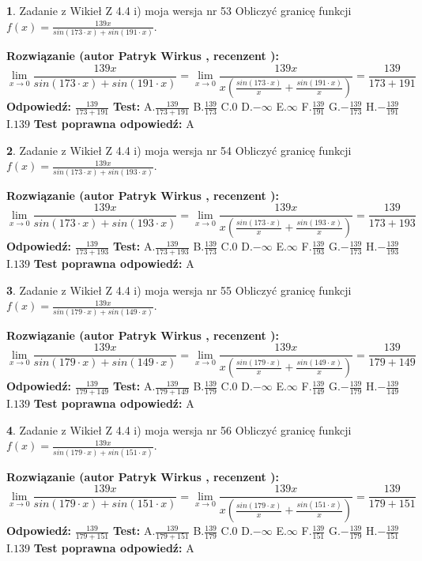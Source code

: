 \documentclass[12pt, a4paper]{article}
\theoremstyle{definition} %
\newtheorem{zad}{}
\newcommand{\zadStart}[1]{\begin{zad}#1\newline}
\newcommand{\zadStop}{\end{zad}}
\newcommand{\rozwStart}[2]{\noindent \textbf{Rozwiązanie (autor #1 , recenzent #2): }\newline}
\newcommand{\rozwStop}{\newline}
\newcommand{\odpStart}{\noindent \textbf{Odpowiedź:}\newline}
\newcommand{\odpStop}{\newline}
\newcommand{\testStart}{\noindent \textbf{Test:}\newline}
\newcommand{\testStop}{\newline}
\newcommand{\kluczStart}{\noindent \textbf{Test poprawna odpowiedź:}\newline}
\newcommand{\kluczStop}{\newline}
\begin{document}
\zadStart{Zadanie z Wikieł Z 4.4 i) moja wersja nr 53}
Obliczyć granicę funkcji $f(x)=\frac{139x}{sin(173\cdot x) +sin(191\cdot x)}$.
\zadStop
\rozwStart{Patryk Wirkus}{}
$$\lim\limits_{x\to 0}\frac{139x}{sin(173\cdot x) +sin(191\cdot x)}=\lim\limits_{x\to 0}\frac{139x}{x(\frac{sin(173\cdot x)}{x}+\frac{sin(191\cdot x)}{x})}=\frac{139}{173+191}$$
\rozwStop
\odpStart
$\frac{139}{173+191}$
\odpStop
\testStart
A.$\frac{139}{173+191}$
B.$\frac{139}{173}$
C.$0$
D.$-\infty$
E.$\infty$
F.$\frac{139}{191}$
G.$-\frac{139}{173}$
H.$-\frac{139}{191}$
I.$139$
\testStop
\kluczStart
A
\kluczStop



\zadStart{Zadanie z Wikieł Z 4.4 i) moja wersja nr 54}
Obliczyć granicę funkcji $f(x)=\frac{139x}{sin(173\cdot x) +sin(193\cdot x)}$.
\zadStop
\rozwStart{Patryk Wirkus}{}
$$\lim\limits_{x\to 0}\frac{139x}{sin(173\cdot x) +sin(193\cdot x)}=\lim\limits_{x\to 0}\frac{139x}{x(\frac{sin(173\cdot x)}{x}+\frac{sin(193\cdot x)}{x})}=\frac{139}{173+193}$$
\rozwStop
\odpStart
$\frac{139}{173+193}$
\odpStop
\testStart
A.$\frac{139}{173+193}$
B.$\frac{139}{173}$
C.$0$
D.$-\infty$
E.$\infty$
F.$\frac{139}{193}$
G.$-\frac{139}{173}$
H.$-\frac{139}{193}$
I.$139$
\testStop
\kluczStart
A
\kluczStop



\zadStart{Zadanie z Wikieł Z 4.4 i) moja wersja nr 55}
Obliczyć granicę funkcji $f(x)=\frac{139x}{sin(179\cdot x) +sin(149\cdot x)}$.
\zadStop
\rozwStart{Patryk Wirkus}{}
$$\lim\limits_{x\to 0}\frac{139x}{sin(179\cdot x) +sin(149\cdot x)}=\lim\limits_{x\to 0}\frac{139x}{x(\frac{sin(179\cdot x)}{x}+\frac{sin(149\cdot x)}{x})}=\frac{139}{179+149}$$
\rozwStop
\odpStart
$\frac{139}{179+149}$
\odpStop
\testStart
A.$\frac{139}{179+149}$
B.$\frac{139}{179}$
C.$0$
D.$-\infty$
E.$\infty$
F.$\frac{139}{149}$
G.$-\frac{139}{179}$
H.$-\frac{139}{149}$
I.$139$
\testStop
\kluczStart
A
\kluczStop



\zadStart{Zadanie z Wikieł Z 4.4 i) moja wersja nr 56}
Obliczyć granicę funkcji $f(x)=\frac{139x}{sin(179\cdot x) +sin(151\cdot x)}$.
\zadStop
\rozwStart{Patryk Wirkus}{}
$$\lim\limits_{x\to 0}\frac{139x}{sin(179\cdot x) +sin(151\cdot x)}=\lim\limits_{x\to 0}\frac{139x}{x(\frac{sin(179\cdot x)}{x}+\frac{sin(151\cdot x)}{x})}=\frac{139}{179+151}$$
\rozwStop
\odpStart
$\frac{139}{179+151}$
\odpStop
\testStart
A.$\frac{139}{179+151}$
B.$\frac{139}{179}$
C.$0$
D.$-\infty$
E.$\infty$
F.$\frac{139}{151}$
G.$-\frac{139}{179}$
H.$-\frac{139}{151}$
I.$139$
\testStop
\kluczStart
A
\kluczStop
\end{document}
